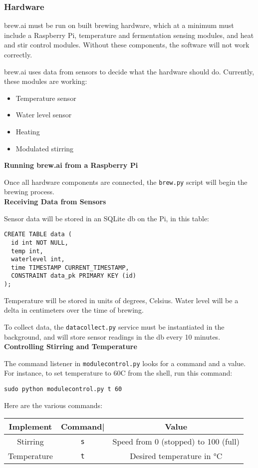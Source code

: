 \subsubsection{Hardware}
brew.ai must be run on built brewing hardware, which at a minimum must include a Raspberry Pi, temperature and fermentation sensing modules, and heat and stir control modules. Without these components, the software will not work correctly. 

brew.ai uses data from sensors to decide what the hardware should do. Currently, these
modules are working:
\begin{itemize}
\item Temperature sensor
\item Water level sensor
\item Heating
\item Modulated stirring
\end{itemize}

\textbf{Running brew.ai from a Raspberry Pi}

Once all hardware components are connected, the \verb|brew.py| script will begin the brewing process. \\

\textbf{Receiving Data from Sensors}

Sensor data will be stored in an SQLite db on the Pi, in this table:

\begin{lstlisting}
CREATE TABLE data ( 
  id int NOT NULL,
  temp int,
  waterlevel int,
  time TIMESTAMP CURRENT_TIMESTAMP,
  CONSTRAINT data_pk PRIMARY KEY (id)
);
\end{lstlisting}

Temperature will be stored in units of degrees, Celsius. Water level will be a delta in centimeters
over the time of brewing.

To collect data, the \verb|datacollect.py| service must be instantiated in the background, and will store sensor
readings in the db every 10 minutes.\\


\textbf{Controlling Stirring and Temperature}

The command listener in \verb|modulecontrol.py| looks for a command and a value.
For instance, to set temperature to 60C from the shell, run this command:

\verb|sudo python modulecontrol.py t 60|

Here are the various commands:

\begin{center}
\begin{tabular}{ c c c }
 Implement     & Command|  & Value \\
\hline
 Stirring      & \verb|s|      & Speed from 0 (stopped) to 100 (full) \\
 Temperature   & \verb|t|      & Desired temperature in °C              
\end{tabular}
\end{center}


